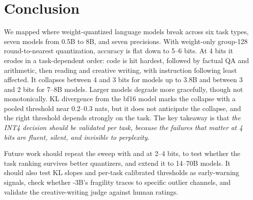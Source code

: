 \section{Conclusion}
\label{sec:conclusion}

We mapped where weight-quantized language models break across six task types, seven models from 0.5B to 8B, and seven precisions. With weight-only group-128 round-to-nearest quantization, accuracy is flat down to 5--6 bits. At 4 bits it erodes in a task-dependent order: code is hit hardest, followed by factual QA and arithmetic, then reading and creative writing, with instruction following least affected. It collapses between 4 and 3 bits for models up to 3.8B and between 3 and 2 bits for 7--8B models. Larger models degrade more gracefully, though not monotonically. KL divergence from the bf16 model marks the collapse with a pooled threshold near 0.2--0.3 nats, but it does not anticipate the collapse, and the right threshold depends strongly on the task. The key takeaway is that \emph{the INT4 decision should be validated per task, because the failures that matter at 4 bits are fluent, silent, and invisible to perplexity}.

Future work should repeat the sweep with \gptq and \awq at 2--4 bits, to test whether the task ranking survives better quantizers, and extend it to 14--70B models. It should also test KL slopes and per-task calibrated thresholds as early-warning signals, check whether \qwen-3B's fragility traces to specific outlier channels, and validate the creative-writing judge against human ratings.
